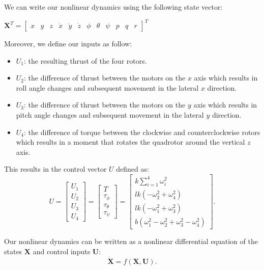 We can write our nonlinear dynamics using the following state vector:

$\boldsymbol{X}^{T}=\left[\begin{array}{cccccccccccc}{x} & {y} & {z} & {\dot{x}} & {\dot{y}} & {\dot{z}} & {\phi} & {\theta} & {\psi} & {p} & {q} & {r}\end{array}\right]^{T}$

Moreover, we define our inputs as follow:
\begin{itemize}
  \item $U_1$: the resulting thrust of the four rotors.
  \item $U_2$: the difference of thrust between the motors on the $x$ axis which results in roll angle changes and subsequent movement in the lateral $x$ direction.
  \item $U_3$: the difference of thrust between the motors on the $y$ axis which results in pitch
  angle changes and subsequent movement in the lateral $y$ direction.
  \item $U_4$: the difference of torque between the clockwise and counterclockwise rotors which
  results in a moment that rotates the quadrotor around the vertical $z$ axis.
\end{itemize}

This results in the control vector $U$ defined as:
$$U=\left[ \begin{array}{l}{U_{1}} \\ {U_{2}} \\ {U_{3}} \\ {U_{4}}\end{array}\right]= \left[ \begin{array}{c}{T} \\ {\tau_{\phi}} \\ {\tau_{\theta}} \\ {\tau_{\psi}}\end{array}\right]=
\left[ \begin{array}{c}
{k \sum_{i=1}^{4} \omega_{i}^{2}} \\
{l k\left(-\omega_{2}^{2}+\omega_{4}^{2}\right)} \\ 
{l k\left(-\omega_{1}^{2}+\omega_{3}^{2}\right)} \\ 
{b(\omega_{1}^{2}-\omega_{2}^{2}+\omega_{3}^{2}-\omega_{4}^{2})}\end{array}\right]
.$$

Our nonlinear dynamics can be written as a nonlinear differential equation of the states $\boldsymbol{X}$ and control inputs $\boldsymbol{U}$:
\begin{equation}
  \label{eq:dynamics}
  \dot{\boldsymbol{X}}=f(\boldsymbol{X}, \boldsymbol{U}).
\end{equation}

